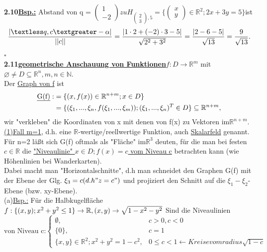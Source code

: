 \documentclass[]{scrartcl}
\begin{document}
\textbf{2.10\underline{Bsp.:}} Abstand von q = $\begin{pmatrix}
	1\\-2
\end{pmatrix} zu H_{\begin{pmatrix}
	2\\3
\end{pmatrix},5} =\{\begin{pmatrix}
	x\\y
\end{pmatrix} \in \mathbb{R}^2;2x+3y=5\}$ist\\
\begin{equation}
	\frac{|\textless q,c 
	\textgreater-\alpha|}{||c||}=\frac{|1\cdot2+(-2)\cdot3-5|}{\sqrt{2^2+3^2}}=
	\frac{|2-6-5|}{\sqrt{13}}=\frac{9}{\sqrt{13}}.
\end{equation}
\hfill$\square$\\
\textbf{2.11\underline{geometrische Anschauung von 
Funktionen}}$f:D\rightarrow\mathbb{R}^m$ mit $ \varnothing \neq D \subseteq 
\mathbb{R}^n,m,n\in\mathbb{N}.$\\
Der \ul{Graph von f} ist 
\begin{align}
	\text{\ul{G(f)}}:&=\{(x,f(x))\in \mathbb{R}^{n+m};x\in D\}\\
	&=\{(\xi_1,...,\xi_n,f(\xi_1,...,\xi_m));(\xi_1,...,\xi_n)^T\in D\}\subseteq 
	\mathbb{R}^{n+m},
\end{align}
wir "verkleben" die Koordinaten von x mit denen von f(x) zu Vektoren 
im$\mathbb{R}^{n+m}$.\\
\underline{(1)Fall m=1}, d.h. eine $\mathbb{R}$-wertige/reellwertige Funktion, 
auch  \ul{Skalarfeld} genannt.\\
Für n=2 läßt sich G(f) oftmals als "Fläche" im$\mathbb{R}^3$ deuten, für die 
man bei festen $c \in \mathbb{R}$ die \ul{"Niveaulinie" ${x\in D;f(x)=c}$ vom 
Niveau c} betrachten kann (wie Höhenlinien bei Wanderkarten).\\
Dabei macht man "Horizontalschnitte", d.h man schneidet den Graphen G(f) mit 
der Ebene
der Glg. $\xi_3= c(d.h"z=c")$ und projiziert den Schnitt auf die 
$\xi_1-\xi_2$-Ebene (bzw. xy-Ebene).\\
(a)\underline{Bsp.:} Für die Halbkugelfläche $f:\{(x,y); x^2+y^2\leq 
1\}\rightarrow\mathbb{R}, (x,y)\rightarrow \sqrt{1-x^2-y^2}\\$
Sind die Niveaulinien\\
\begin{equation}
	\text{von Niveau c:}\begin{cases}
		\emptyset, & c>0,c<0\\
		\{0\}, & c=1\\
		\{x,y\}\in \mathbb{R}^2;x^2+y^2=1-c^2, & 0\leq c<1\leftarrow Kreise vom 
		radius\sqrt{1-c}
	\end{cases}
\end{equation}
\end{document}

